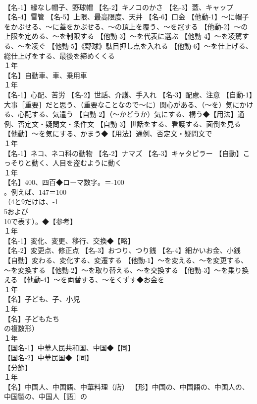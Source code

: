 \documentclass[8pt]{extreport}
\begin{document}
\begin{CJK}{UTF8}{min}
\\	【名-1】縁なし帽子、野球帽 【名-2】キノコのかさ 【名-3】蓋、キャップ 【名-4】雷管 【名-5】上限、最高限度、天井 【名-6】口金 【他動-1】～に帽子をかぶせる、～に蓋をかぶせる、～の頂上を覆う、～を冠する 【他動-2】～の上限を定める、～を制限する 【他動-3】～を代表に選ぶ 【他動-4】～を凌駕する、～を凌ぐ 【他動-5】《野球》駄目押し点を入れる 【他動-6】～を仕上げる、総仕上げをする、最後を締めくくる
\\	１年	
\\	【名】自動車、車、乗用車
\\	１年	
\\	【名-1】心配、苦労 【名-2】世話、介護、手入れ 【名-3】配慮、注意 【自動-1】大事［重要］だと思う、（重要なことなので～に）関心がある、（～を）気にかける、心配する、気遣う 【自動-2】（～かどうか）気にする、構う◆【用法】通例、否定文・疑問文・条件文 【自動-3】世話をする、看護する、面倒を見る 【他動】～を気にする、かまう◆【用法】通例、否定文・疑問文で
\\	１年	
\\	【名-1】ネコ、ネコ科の動物 【名-2】ナマズ 【名-3】キャタピラー 【自動】こっそりと動く、人目を盗むように動く
\\	１年	
\\	【名】400、四百◆ローマ数字。＝-100
\\	。例えば、147＝100
\\	（4と9だけは、-1
\\	5および 
\\	10で表す）。◆【参考】
\\	１年	
\\	【名-1】変化、変更、移行、交換◆【略】
\\	【名-2】変更点、修正点 【名-3】おつり、つり銭 【名-4】細かいお金、小銭 【自動】変わる、変化する、変遷する 【他動-1】～を変える、～を変更する、～を変換する 【他動-2】～を取り替える、～を交換する 【他動-3】～を乗り換える 【他動-4】～を両替する、～をくずす◆お金を
\\	１年	
\\	【名】子ども、子、小児
\\	１年	
\\	【名】子どもたち
\\	の複数形）
\\	１年	
\\	【国名-1】中華人民共和国、中国◆【同】
\\	【国名-2】中華民国◆【同】
\\	【分節】
\\	１年	
\\	【名】中国人、中国語、中華料理（店） 【形】中国の、中国語の、中国人の、中国製の、中国人［語］の

\end{CJK}
\end{document}
